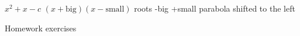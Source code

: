 \documentclass[12pt, a4paper]{exam}
\newcommand{\monicquad}[2]{%
    x^2%
    \ifnum\numexpr#1+#2>0 + \the\numexpr#1+#2\relax \else \ifnum\numexpr#1+#2<0 \the\numexpr#1+#2\relax \fi\fi%
    \ifnum\numexpr#1+#2=0 \else x\fi%
    \ifnum\numexpr#1*#2>0 + \the\numexpr#1*#2\relax \else \ifnum\numexpr#1*#2<0 \the\numexpr#1*#2\relax \fi\fi%
}
\newcommand{\largespace}{\vspace{19mm}}
\newcommand{\Largespace}{\vspace{44mm}}
\begin{document}
\begin{questions}
\largespace

\question 
$x^2 + x -c$ \quad
 $(x+\text{big} )(x - \text{small} )$  \quad
roots -big +small
parabola shifted to the left

\begin{parts}\Large
{}\Largespace
{}
\end{parts}

\largespace

\footnotesize
\question Homework exercises
\begin{parts}
\end{parts}
\end{questions}
\end{document}
